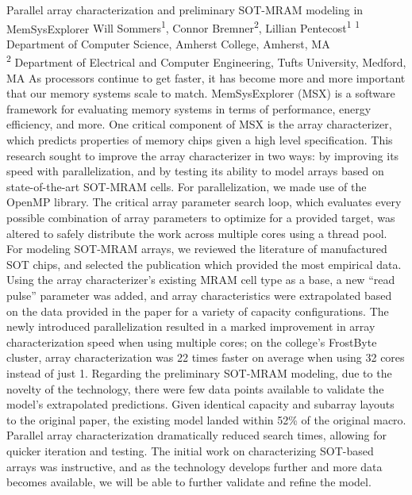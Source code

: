 \makeabstract
    {
    Parallel array characterization and preliminary SOT-MRAM modeling in MemSysExplorer
    }
    {
    Will Sommers\textsuperscript{1}, Connor Bremner\textsuperscript{2}, Lillian Pentecost\textsuperscript{1}
    }
    {
    \textsuperscript{1} Department of Computer Science, Amherst College, Amherst, MA\\
\textsuperscript{2} Department of Electrical and Computer Engineering, Tufts University, Medford, MA
    }
    {
    As processors continue to get faster, it has become more and more important that our memory systems scale to match. MemSysExplorer (MSX) is a software framework for evaluating memory systems in terms of performance, energy efficiency, and more. One critical component of MSX is the array characterizer, which predicts properties of memory chips given a high level specification. This research sought to improve the array characterizer in two ways: by improving its speed with parallelization, and by testing its ability to model arrays based on state-of-the-art SOT-MRAM cells.
    }
    {
    For parallelization, we made use of the OpenMP library. The critical array parameter search loop, which evaluates every possible combination of array parameters to optimize for a provided target, was altered to safely distribute the work across multiple cores using a thread pool. For modeling SOT-MRAM arrays, we reviewed the literature of manufactured SOT chips, and selected the publication which provided the most empirical data. Using the array characterizer{\textquoteright}s existing MRAM cell type as a base, a new {\textquotedblleft}read pulse{\textquotedblright} parameter was added, and array characteristics were extrapolated based on the data provided in the paper for a variety of capacity configurations.
    }
    {
    The newly introduced parallelization resulted in a marked improvement in array characterization speed when using multiple cores; on the college{\textquoteright}s FrostByte cluster, array characterization was 22 times faster on average when using 32 cores instead of just 1. Regarding the preliminary SOT-MRAM modeling, due to the novelty of the technology, there were few data points available to validate the model{\textquoteright}s extrapolated predictions. Given identical capacity and subarray layouts to the original paper, the existing model landed within 52\% of the original macro.
    }
    {
    Parallel array characterization dramatically reduced search times, allowing for quicker iteration and testing. The initial work on characterizing SOT-based arrays was instructive, and as the technology develops further and more data becomes available, we will be able to further validate and refine the model.
    }

    \newpage
    